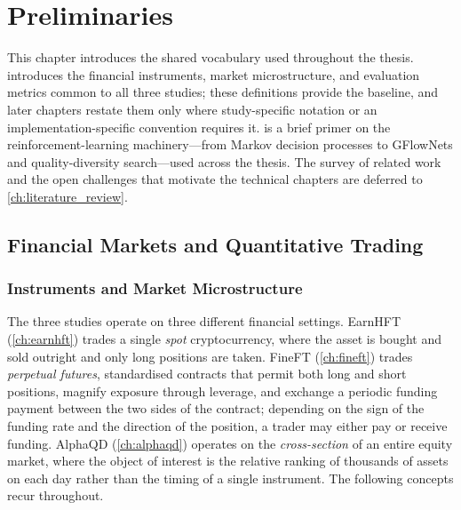 
\chapter{Preliminaries} %
\label{ch:preliminaries}

This chapter introduces the shared vocabulary used throughout the thesis.  introduces the financial instruments, market microstructure, and evaluation metrics common to all three studies; these definitions provide the baseline, and later chapters restate them only where study-specific notation or an implementation-specific convention requires it.  is a brief primer on the reinforcement-learning machinery---from Markov decision processes to GFlowNets and quality-diversity search---used across the thesis. The survey of related work and the open challenges that motivate the technical chapters are deferred to \cref{ch:literature_review}.

\section{Financial Markets and Quantitative Trading}
\label{sec:bg_finance}

\subsection{Instruments and Market Microstructure}
\label{sec:bg_instruments}

The three studies operate on three different financial settings. EarnHFT (\cref{ch:earnhft}) trades a single \emph{spot} cryptocurrency, where the asset is bought and sold outright and only long positions are taken. FineFT (\cref{ch:fineft}) trades \emph{perpetual futures}, standardised contracts that permit both long and short positions, magnify exposure through leverage, and exchange a periodic funding payment between the two sides of the contract; depending on the sign of the funding rate and the direction of the position, a trader may either pay or receive funding. AlphaQD (\cref{ch:alphaqd}) operates on the \emph{cross-section} of an entire equity market, where the object of interest is the relative ranking of thousands of assets on each day rather than the timing of a single instrument. The following concepts recur throughout.

